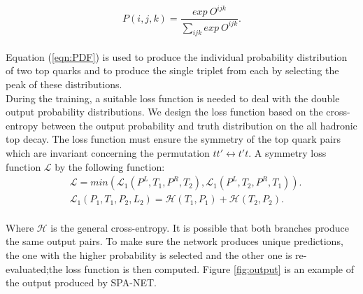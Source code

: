 \\
\begin{equation}\label{eqn:PDF}
	P(i,j,k) = \frac{exp\ O^{ijk}}{\sum_{ijk} exp\ O^{ijk}}.
\end{equation}
\\
Equation (\ref{eqn:PDF}) is used to produce the individual probability distribution of two top quarks and to produce the single triplet from each by selecting the peak of these distributions. 
\\
During the training, a suitable loss function is needed to deal with the double output probability distributions. We design the loss function based on the cross-entropy between the output probability and truth distribution on the all hadronic top decay. The loss function must ensure the symmetry of the top quark pairs which are invariant concerning the permutation $tt' \leftrightarrow t't$.  A symmetry loss function $\mathcal{L}$ by the following function:
\\
\begin{align}
		&\mathcal{L} = min(\mathcal{L}_{1}(P^{L}, T_{1}, P^{R}, T_{2}), \mathcal{L}_{1}(P^{L}, T_{2}, P^{R}, T_{1})). \\
		&\mathcal{L}_{1}(P_{1}, T_{1}, P_{2}, L_{2}) = \mathcal{H}(T_{1}, P_{1}) +\mathcal{H}(T_{2}, P_{2}).
\end{align}
\\
Where $\mathcal{H}$ is the general cross-entropy. It is possible that both branches produce the same output pairs. To make sure the network produces unique predictions, the one with the higher probability is selected and the other one is re-evaluated;the loss function is then computed. Figure \ref{fig:output} is an example of the output produced by SPA-NET.










